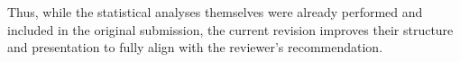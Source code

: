 \documentclass[12pt,letterpaper]{article}
\begin{document}
\begin{enumerate}
 

Thus, while the statistical analyses themselves were already performed and included in the original submission, the current revision improves their structure and presentation to fully align with the reviewer’s recommendation.


 


 











\end{enumerate}
\end{document}
